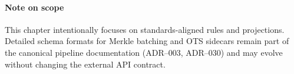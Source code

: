 
\paragraph{Note on scope}
This chapter intentionally focuses on standards-aligned rules and projections.
Detailed schema formats for Merkle
batching and \ac{OTS} sidecars remain part of the canonical pipeline documentation (\ac{ADR}--003, \ac{ADR}--030) and may evolve
without changing the external \ac{API} contract.

